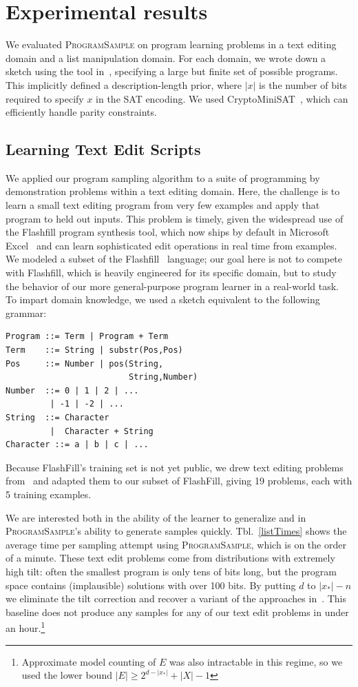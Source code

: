 \documentclass{article}
\newcommand{\theSystem}{\textsc{ProgramSample}}
\begin{document}
  \section{Experimental results}

  We evaluated \theSystem{} on program learning problems in a text editing domain and a list manipulation domain.
  For each domain, we wrote down a sketch using the tool in~\cite{solar2006combinatorial}, specifying a large but finite set of possible programs.
  This implicitly defined a description-length prior, where $|x|$ is the number of bits required to specify $x$ in the SAT encoding.
We used   CryptoMiniSAT~\cite{crypto}, which can efficiently handle parity constraints.
  

\subsection{Learning Text Edit Scripts}
We applied our program sampling algorithm to a suite of programming by demonstration problems within a text editing domain.
Here, the challenge is to learn a small text editing program from very few examples
and apply that program to held out inputs.
This problem is timely, given the widespread use of the Flashfill program synthesis tool, which now ships by default in Microsoft Excel~\cite{real_world} and can learn sophisticated edit operations in real time from examples.
We modeled a subset of the Flashfill~\cite{Gulwani:2011:ASP:1926385.1926423} language;
our goal here is not to compete with Flashfill, which is heavily engineered for its specific domain,
but to study the behavior of our more general-purpose program learner in a real-world task.
To impart domain knowledge, we used a sketch equivalent to the following grammar:
\begin{verbatim}
Program ::= Term | Program + Term
Term    ::= String | substr(Pos,Pos)
Pos     ::= Number | pos(String,
                         String,Number)
Number  ::= 0 | 1 | 2 | ... 
         | -1 | -2 | ...
String  ::= Character 
         |  Character + String
Character ::= a | b | c | ...
\end{verbatim}
Because FlashFill's training set is not yet public, we drew text editing problems from~\cite{DBLP:conf/ecai/LinDETM14} and adapted them to our subset of FlashFill, giving 19 problems, each with 5 training examples.

We are interested both in the ability of the learner to generalize
and in \theSystem{}'s ability to generate samples quickly.
Tbl.~\ref{listTimes} shows the average time per sampling attempt using \theSystem{}, which is on the order of a minute.
These text edit problems come from distributions with extremely high tilt: often the smallest program is only tens of  bits long, but the program space contains (implausible) solutions with over 100 bits.
 By putting $d$ to $|x_*|-n$ we eliminate the tilt correction and recover a variant of the approaches in~\cite{ermon2013embed}. %
This baseline does not produce any samples for any of our text edit problems in under an hour.\footnote{Approximate model counting of $E$ was also intractable in this regime, so we used the lower bound $|E|\geq 2^{d-|x_*|} + |X| - 1$}
\end{document}
